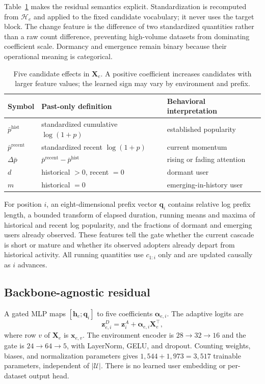 \documentclass[sigconf,anonymous,review]{acmart}
\begin{document}
Table~\ref{tab:features} makes the residual semantics explicit. Standardization is recomputed from $\mathcal H_e$ and applied to the fixed candidate vocabulary; it never uses the target block. The change feature is the difference of two standardized quantities rather than a raw count difference, preventing high-volume datasets from dominating coefficient scale. Dormancy and emergence remain binary because their operational meaning is categorical.

\begin{table}[t]
\caption{Five candidate effects in $\mathbf X_e$. A positive coefficient increases candidates with larger feature values; the learned sign may vary by environment and prefix.}
\label{tab:features}
\centering
\small
\begin{tabular}{@{}lp{3.35cm}p{3.2cm}@{}}
\toprule
Symbol & Past-only definition & Behavioral interpretation\\
\midrule
$\bar p^{\mathrm{hist}}$ & standardized cumulative $\log(1+p)$ & established popularity\\
$\bar p^{\mathrm{recent}}$ & standardized recent $\log(1+p)$ & current momentum\\
$\Delta\bar p$ & $\bar p^{\mathrm{recent}}-\bar p^{\mathrm{hist}}$ & rising or fading attention\\
$d$ & historical $>0$, recent $=0$ & dormant user\\
$m$ & historical $=0$ & emerging-in-history user\\
\bottomrule
\end{tabular}
\end{table}

For position $i$, an eight-dimensional prefix vector $\mathbf q_i$ contains relative log prefix length, a bounded transform of elapsed duration, running means and maxima of historical and recent log popularity, and the fractions of dormant and emerging users already observed. These features tell the gate whether the current cascade is short or mature and whether its observed adopters already depart from historical activity. All running quantities use $c_{1:i}$ only and are updated causally as $i$ advances.

\subsection{Backbone-agnostic residual}
A gated MLP maps $[\mathbf h_e;\mathbf q_i]$ to five coefficients $\boldsymbol\alpha_{e,i}$. The adaptive logits are
\begin{equation}
\mathbf z^{D}_{e,i}=\mathbf z^A_i+\boldsymbol\alpha_{e,i}\mathbf X_e^\top,
\label{eq:residual}
\end{equation}
where row $v$ of $\mathbf X_e$ is $\mathbf x_{e,v}$. The environment encoder is $28\to32\to16$ and the gate is $24\to64\to5$, with LayerNorm, GELU, and dropout. Counting weights, biases, and normalization parameters gives $1{,}544+1{,}973=3{,}517$ trainable parameters, independent of $|\mathcal U|$. There is no learned user embedding or per-dataset output head.
\end{document}
